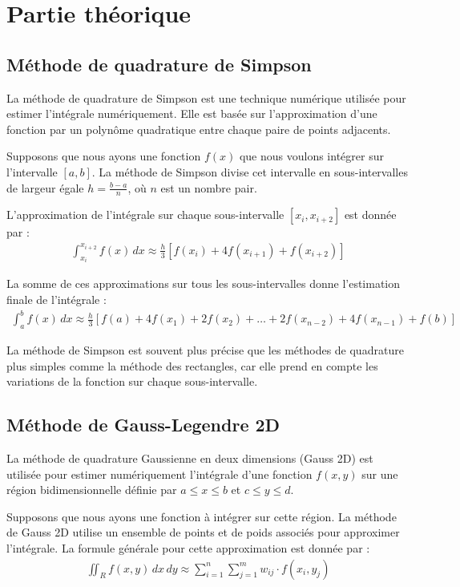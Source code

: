 \documentclass[10pt,a4paper]{article}
\begin{document}
\section{Partie théorique}

\subsection{Méthode de quadrature de Simpson}

La méthode de quadrature de Simpson est une technique numérique utilisée pour estimer l'intégrale numériquement. Elle est basée sur l'approximation d'une fonction par un polynôme quadratique entre chaque paire de points adjacents.

Supposons que nous ayons une fonction $f(x)$ que nous voulons intégrer sur l'intervalle $[a, b]$. La méthode de Simpson divise cet intervalle en sous-intervalles de largeur égale $h = \frac{b - a}{n}$, où $n$ est un nombre pair.

L'approximation de l'intégrale sur chaque sous-intervalle $[x_i, x_{i+2}]$ est donnée par :
\begin{align*}
\int_{x_i}^{x_{i+2}} f(x) \,dx \approx \frac{h}{3} \left[ f(x_i) + 4f(x_{i+1}) + f(x_{i+2}) \right]
\end{align*}

La somme de ces approximations sur tous les sous-intervalles donne l'estimation finale de l'intégrale :
\begin{align*}
\int_{a}^{b} f(x) \,dx \approx \frac{h}{3} \left[ f(a) + 4f(x_1) + 2f(x_2) + \ldots + 2f(x_{n-2}) + 4f(x_{n-1}) + f(b) \right]
\end{align*}

La méthode de Simpson est souvent plus précise que les méthodes de quadrature plus simples comme la méthode des rectangles, car elle prend en compte les variations de la fonction sur chaque sous-intervalle.


\subsection{Méthode de Gauss-Legendre 2D}


La méthode de quadrature Gaussienne en deux dimensions (Gauss 2D) est utilisée pour estimer numériquement l'intégrale d'une fonction $f(x, y)$ sur une région bidimensionnelle définie par $a \leq x \leq b$ et $c \leq y \leq d$.

Supposons que nous ayons une fonction à intégrer sur cette région. La méthode de Gauss 2D utilise un ensemble de points et de poids associés pour approximer l'intégrale. La formule générale pour cette approximation est donnée par :
\begin{align*}
\iint_{R} f(x, y) \,dx\,dy \approx \sum_{i=1}^{n} \sum_{j=1}^{m} w_{ij} \cdot f(x_i, y_j)
\end{align*}
\end{document}
